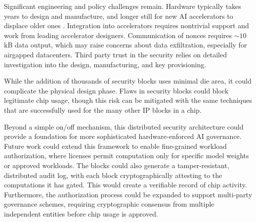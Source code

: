 \documentclass{article}
\begin{document}

Significant engineering and policy challenges remain. Hardware typically takes years to design and manufacture, and longer still for new AI accelerators to displace older ones \cite{emberson_stock_2025}. Integration into accelerators requires nontrivial support and work from leading accelerator designers. Communication of nonces requires $\sim 10$kB data output, which may raise concerns about data exfiltration, especially for airgapped datacenters. Third party trust in the security relies on detailed investigation into the design, manufacturing, and key provisioning. 

While the addition of thousands of security blocks uses minimal die area, it could complicate the physical design phase. Flaws in security blocks could block legitimate chip usage, though this risk can be mitigated with the same techniques that are successfully used for the many other IP blocks in a chip.

Beyond a simple on/off mechanism, this distributed security architecture could provide a foundation for more sophisticated hardware-enforced AI governance. Future work could extend this framework to enable fine-grained workload authorization, where licenses permit computation only for specific model weights or approved workloads. The blocks could also generate a tamper-resistant, distributed audit log, with each block cryptographically attesting to the computations it has gated. This would create a verifiable record of chip activity. Furthermore, the authorization process could be expanded to support multi-party governance schemes, requiring cryptographic consensus from multiple independent entities before chip usage is approved. 
\end{document}
